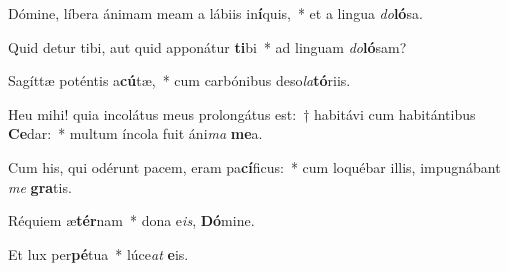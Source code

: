 \item Dómine, líbera ánimam meam a lábiis in\textbf{í}quis,~* et a lingua \textit{do}\textbf{ló}sa.

\item Quid detur tibi, aut quid apponátur \textbf{ti}bi~* ad linguam \textit{do}\textbf{ló}sam?

\item Sagíttæ poténtis a\textbf{cú}tæ,~* cum carbónibus deso\textit{la}\textbf{tó}riis.

\item Heu mihi! quia incolátus meus prolongátus est:~† habitávi cum habitántibus \textbf{Ce}dar:~* multum íncola fuit áni\textit{ma} \textbf{me}a.

\item Cum his, qui odérunt pacem, eram pa\textbf{cí}ficus:~* cum loquébar illis, impugnábant \textit{me} \textbf{gra}tis.

\item Réquiem æ\textbf{tér}nam~* dona e\textit{is}, \textbf{Dó}mine.

\item Et lux per\textbf{pé}tua~* lúce\textit{at} \textbf{e}is.